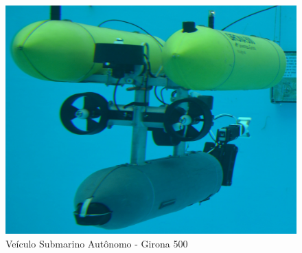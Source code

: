 \begin{figure}[H]
 	\centering
 	\includegraphics[scale=0.1]{./Resources/G500.jpg}
 	\caption{Veículo Submarino Autônomo - Girona 500}
 	\label{G500}
\end{figure}

